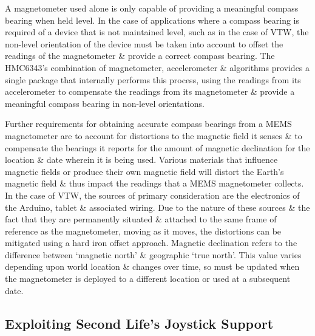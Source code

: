 A magnetometer used alone is only capable of providing a meaningful compass bearing when held level. In the case of applications where a compass bearing is required of a device that is not maintained level, such as in the case of VTW, the non-level orientation of the device must be taken into account to offset the readings of the magnetometer \& provide a correct compass bearing. The HMC6343's combination of magnetometer, accelerometer \& algorithms provides a single package that internally performs this process, using the readings from its accelerometer to compensate the readings from its magnetometer \& provide a meaningful compass bearing in non-level orientations.

Further requirements for obtaining accurate compass bearings from a MEMS magnetometer are to account for distortions to the magnetic field it senses \& to compensate the bearings it reports for the amount of magnetic declination for the location \& date wherein it is being used. Various materials that influence magnetic fields or produce their own magnetic field will distort the Earth's magnetic field \& thus impact the readings that a MEMS magnetometer collects. In the case of VTW, the sources of primary consideration are the electronics of the Arduino, tablet \& associated wiring. Due to the nature of these sources \& the fact that they are permanently situated \& attached to the same frame of reference as the magnetometer, moving as it moves, the distortions can be mitigated using a hard iron offset approach. Magnetic declination refers to the difference between `magnetic north' \& geographic `true north'. This value varies depending upon world location \& changes over time, so must be updated when the magnetometer is deployed to a different location or used at a subsequent date.



\subsection{Exploiting Second Life's Joystick Support}

\label{exploitJoystick}

\newcommand{\ArduinoJoystickVideoFootnote}{\footnote{\url{https://www.youtube.com/watch?v=-ddtmqoGNmg}}}

\newcommand{\atmegaFootnote}{\footnote{\url{http://www.atmel.com/devices/ATMEGA16U2.aspx}}}

